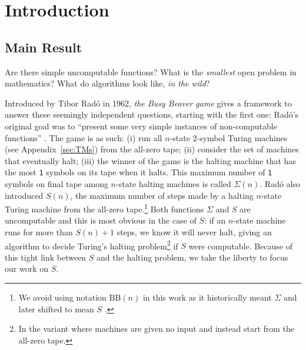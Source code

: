 \documentclass[letterpaper,british,11pt]{article}
\theoremstyle{definition} %
\numberwithin{equation}{section}
\theoremstyle{definition} %
\newcommand{\sone}{\texttt{1}\xspace}
\newcommand{\radofull}{Tibor Rad\'o\xspace}
\newcommand{\rado}{Rad\'o\xspace}
\begin{document}
\section{Introduction}\label{sec:intro}

\subsection{Main Result}\label{sec:intro:mainresults}

\newcommand{\noncomput}{uncomputable\xspace}
\newcommand{\BBfull}{Busy Beaver\xspace}
\newcommand{\Coq}{Coq\xspace}
\newcommand{\CoqProofReleaseURL}{\url{https://github.com/ccz181078/Coq-BB5}}

\newcommand{\ie}{i.e.~}
\newcommand{\eg}{e.g.~}

Are there simple \noncomput functions? What is the \textit{smallest} open problem in mathematics? What do algorithms look like, \textit{in the wild}?

Introduced by \radofull in 1962, \textit{the \BBfull game} gives a framework to answer these seemingly independent questions, starting with the first one: \rado's original goal was to ``present some very simple instances of non-computable functions'' \cite{Rado_1962}. The game is as such: (i) run all $n$-state 2-symbol Turing machines (see Appendix~\ref{sec:TMs}) from the all-zero tape; (ii) consider the set of machines that eventually halt; (iii) the winner of the game is the halting machine that has the most \sone symbols on its tape when it halts. This maximum number of \sone symbols on final tape among $n$-state halting machines is called $\Sigma(n)$. \rado also introduced $S(n)$, the maximum number of steps made by a halting $n$-state Turing machine from the all-zero tape.\footnote{We avoid using notation $\text{BB}(n)$ in this work as it historically meant $\Sigma$ \cite{Rado_1962, 10.5555/1151785.1151794} and later shifted to mean $S$ \cite{BusyBeaverFrontier,sterin_2022_14955828}.} Both functions $\Sigma$ and $S$ are \noncomput and this is most obvious in the case of $S$: if an $n$-state machine runs for more than $S(n)+1$ steps, we know it will never halt, giving an algorithm to decide Turing's halting problem\footnote{In the variant where machines are given no input and instead start from the all-zero tape.} if $S$ were computable. Because of this tight link between $S$ and the halting problem, we take the liberty to focus our work on $S$.
\end{document}
